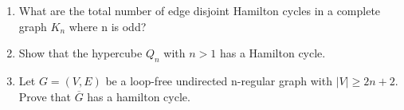 \documentclass[a4paper]{article}
\begin{document}
\begin{enumerate}
\item What are the total number of edge disjoint Hamilton cycles in a complete graph $K_n$ where n is odd? 
	
\item Show that the hypercube $Q_n$ with $n>1$ has a Hamilton cycle.

	
\item Let $G=(V,E)$ be a loop-free undirected n-regular graph with $|V|\geq 2n+2$. Prove that $\overline{G}$ has a hamilton cycle.

  
	
	
	




\end{enumerate}
\end{document}
